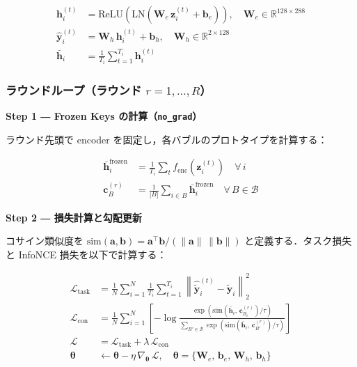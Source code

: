 \documentclass[12pt, a4paper]{ltjsarticle}
\begin{document}
\begin{align}
  \bm{h}_i^{(t)}
  &= \mathrm{ReLU}\!\left(\mathrm{LN}\!\left(\bm{W}_e\,\bm{z}_i^{(t)} + \bm{b}_e\right)\right),
  \quad \bm{W}_e \in \mathbb{R}^{128 \times 288}
  \\
  \hat{\bm{y}}_i^{(t)}
  &= \bm{W}_h\,\bm{h}_i^{(t)} + \bm{b}_h,
  \quad \bm{W}_h \in \mathbb{R}^{2 \times 128}
  \\
  \bar{\bm{h}}_i
  &= \frac{1}{T_i} \sum_{t=1}^{T_i} \bm{h}_i^{(t)}
  \label{eq:hbar}
\end{align}

\subsubsection*{ラウンドループ（ラウンド $r = 1,\ldots,R$）}

\noindent\textbf{Step 1 ― Frozen Keys の計算（\texttt{no\_grad}）}

ラウンド先頭で encoder を固定し，各バブルのプロトタイプを計算する：

\begin{align}
  \bar{\bm{h}}_i^{\text{frozen}}
  &= \frac{1}{T_i} \sum_t f_{\text{enc}}\!\left(\bm{z}_i^{(t)}\right)
  \quad \forall\, i
  \\
  \bm{c}_B^{(r)}
  &= \frac{1}{|B|} \sum_{i \in B} \bar{\bm{h}}_i^{\text{frozen}}
  \quad \forall\, B \in \mathcal{B}
\end{align}

\noindent\textbf{Step 2 ― 損失計算と勾配更新}

コサイン類似度を
$\mathrm{sim}(\bm{a}, \bm{b}) = \bm{a}^\top \bm{b} / (\|\bm{a}\|\,\|\bm{b}\|)$
と定義する．タスク損失と InfoNCE 損失を以下で計算する：

\begin{align}
  \mathcal{L}_{\text{task}}
  &= \frac{1}{N} \sum_{i=1}^{N} \frac{1}{T_i} \sum_{t=1}^{T_i}
    \left\|\hat{\tilde{\bm{y}}}_i^{(t)} - \tilde{\bm{y}}_i\right\|_2^2
  \label{eq:ltask2}
  \\[8pt]
  \mathcal{L}_{\text{con}}
  &= \frac{1}{N} \sum_{i=1}^{N}
    \left[
      -\log
      \frac{
        \exp\!\left(\mathrm{sim}\!\left(\bar{\bm{h}}_i,\,\bm{c}_{B_i}^{(r)}\right) / \tau\right)
      }{
        \displaystyle\sum_{B' \in \mathcal{B}}
        \exp\!\left(\mathrm{sim}\!\left(\bar{\bm{h}}_i,\,\bm{c}_{B'}^{(r)}\right) / \tau\right)
      }
    \right]
  \label{eq:lcon}
  \\[8pt]
  \mathcal{L}
  &= \mathcal{L}_{\text{task}} + \lambda\,\mathcal{L}_{\text{con}}
  \label{eq:ltotal}
  \\[4pt]
  \bm{\theta}
  &\leftarrow \bm{\theta} - \eta\,\nabla_{\bm{\theta}}\,\mathcal{L},
  \quad
  \bm{\theta} = \{\bm{W}_e,\,\bm{b}_e,\,\bm{W}_h,\,\bm{b}_h\}
\end{align}
\end{document}

